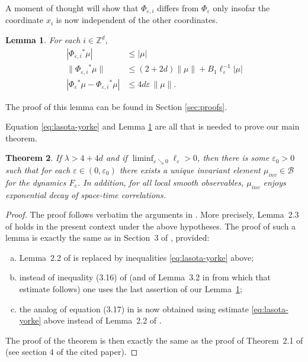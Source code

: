 \documentclass{amsart}
\numberwithin{equation}{section}
\newtheorem{thm}{Theorem}[section]
\newtheorem{lem}[thm]{Lemma}
\begin{document}
A moment of thought will show that $\Phi_{{\varepsilon},i}$ differs from $\Phi_{\varepsilon}$ only
insofar the coordinate $x_i$ is now independent of the other coordinates.
\begin{lem}\label{lem:decouple}
  For each $i\in{{\mathbb Z}}^d$,
  \[
  \begin{split}
    |\Phi_{{\varepsilon},i}{^*}\mu|&\leq |\mu|\\
    \|\Phi_{{\varepsilon},i}{^*}\mu\|&\leq  (2+2d)\|\mu\|+B_1\ell_{\varepsilon}^{-1}|\mu|\\    
    |\Phi_{\varepsilon}{^*}\mu-\Phi_{{\varepsilon},i}{^*}\mu|&\leq 4d{\varepsilon}\, \|\mu\|.
  \end{split}
  \]
\end{lem}
\noindent The proof of this lemma can be found in Section \ref{sec:proofs}.

Equation \eqref{eq:lasota-yorke} and Lemma \ref{lem:decouple} are all that is
needed to prove our main theorem.
\begin{thm}\label{thm:main}
    If $\lambda>4+4d$ and if $\liminf_{{\varepsilon}\searrow0}\ell_{\varepsilon}>0$, then there
    is some ${\varepsilon}_0>0$ such that for each ${\varepsilon}\in(0,{\varepsilon}_0)$ there exists a
    unique invariant element
  $\mu_{inv}\in{{\mathcal B}}$ for the dynamics $F_{\varepsilon}$. In addition, for all local
  smooth observables, $\mu_{inv}$ enjoys exponential decay of space-time
  correlations. 
\end{thm}
\begin{proof}
  The proof follows verbatim the arguments in \cite{kl-cmp}. More precisely,
  Lemma~2.3 of \cite{kl-cmp} holds in the present context under the above
  hypotheses. The proof of such a lemma is  exactly the same as in Section~3 of \cite{kl-cmp}, provided:
  \begin{enumerate}[a)]
  \item Lemma~2.2 of
  \cite{kl-cmp} is replaced by inequalities \eqref{eq:lasota-yorke} above; 
\item instead of inequality (3.16) of \cite{kl-cmp} (and of Lemma~3.2 in
  \cite{kl-cmp} from which that estimate follows) one uses the last assertion
  of our Lemma~\ref{lem:decouple};
\item   the analog of equation (3.17) in \cite{kl-cmp} is now obtained using
    estimate \eqref{eq:lasota-yorke} above instead of Lemma~2.2 of
    \cite{kl-cmp}. 
 \end{enumerate}
 The proof of the theorem is then exactly the same as the proof of Theorem~2.1
 of \cite{kl-cmp} (see section 4 of the cited paper).
\end{proof}
\end{document}
